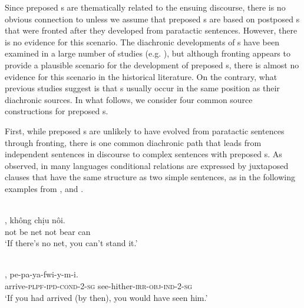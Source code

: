 \documentclass[output=paper]{langsci/langscibook}
\begin{document}
Since preposed s are thematically related to the ensuing discourse, there is no obvious connection to  unless we assume that preposed s are based on postposed s that were fronted after they developed from paratactic sentences. However, there is no evidence for this scenario. The diachronic developments of s have been examined in a large number of studies (e.g. \citealt{Haiman1985,Haspelmath1989,Givón1991,Genetti1991,HarrisCampbell1995,Frajzyngier1996,DisterheftViti2010}), but although fronting appears to provide a plausible scenario for the development of preposed s, there is almost no evidence for this scenario in the historical literature. On the contrary, what previous studies suggest is that s usually occur in the same position as their diachronic sources. In what follows, we consider four common source constructions for preposed s.

First, while preposed s are unlikely to have evolved from paratactic sentences through fronting, there is one common diachronic path that leads from independent sentences in discourse to complex sentences with preposed s. As \citet[39--70]{Haiman1985} observed, in many languages conditional relations are expressed by juxtaposed clauses that have the same structure as two simple sentences, as in the following examples from  ,   and  .

\ea\label{ex:diessel:3}
\\
,  không  chịu  nôi.\\
       not  be   net  not  bear  can\\
\glt   `If there’s no net, you can’t stand it.'
\z

\ea\label{ex:diessel:4}
\\
,    pe-pa-ya-fwi-y-m-i.\\
       arrive-\textsc{plpf}-\textsc{ipd}-\textsc{cond}-2-\textsc{sg}  see-hither-\textsc{irr}-\textsc{obj}-\textsc{ind}-2-\textsc{sg}\\
\glt   `If you had arrived (by then), you would have seen him.'
\z
\end{document}
